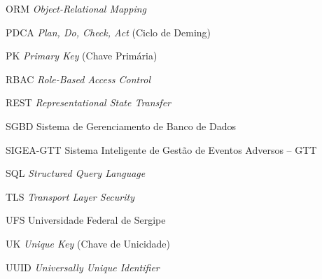 \begin{siglas}
    \item[ORM] \textit{Object-Relational Mapping}
    \item[PDCA] \textit{Plan, Do, Check, Act} (Ciclo de Deming)
    \item[PK] \textit{Primary Key} (Chave Primária)
    \item[RBAC] \textit{Role-Based Access Control}
    \item[REST] \textit{Representational State Transfer}
    \item[SGBD] Sistema de Gerenciamento de Banco de Dados
    \item[SIGEA-GTT] Sistema Inteligente de Gestão de Eventos Adversos -- GTT
    \item[SQL] \textit{Structured Query Language}
    \item[TLS] \textit{Transport Layer Security}
    \item[UFS] Universidade Federal de Sergipe
    \item[UK] \textit{Unique Key} (Chave de Unicidade)
    \item[UUID] \textit{Universally Unique Identifier}
\end{siglas}

